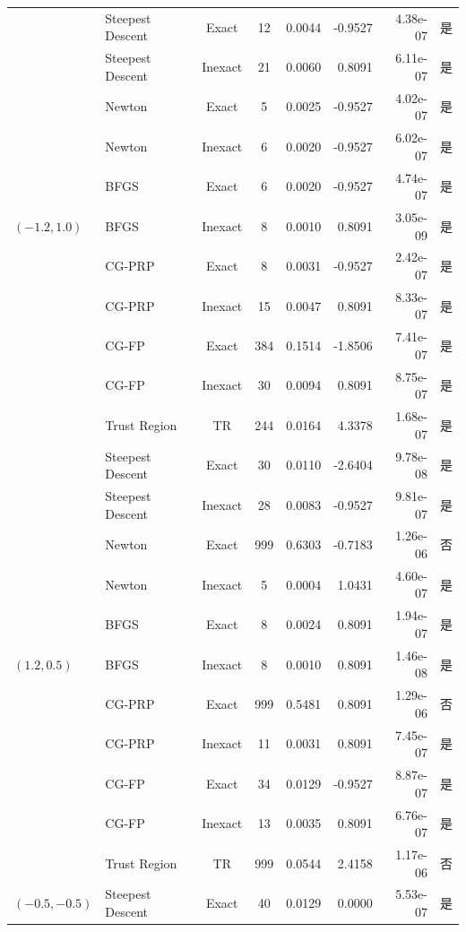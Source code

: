 \documentclass[a4paper,12pt]{article}
\begin{document}
{\begin{longtable}{llccrrrc}
    \multirow{11}{*}{$(-1.2, 1.0)$} 
    & Steepest Descent & Exact & 12 & 0.0044 & -0.9527 & 4.38e-07 & 是 \\
    & Steepest Descent & Inexact & 21 & 0.0060 & 0.8091 & 6.11e-07 & 是 \\
    & Newton & Exact & 5 & 0.0025 & -0.9527 & 4.02e-07 & 是 \\
    & Newton & Inexact & 6 & 0.0020 & -0.9527 & 6.02e-07 & 是 \\
    & BFGS & Exact & 6 & 0.0020 & -0.9527 & 4.74e-07 & 是 \\
    & BFGS & Inexact & 8 & 0.0010 & 0.8091 & 3.05e-09 & 是 \\
    & CG-PRP & Exact & 8 & 0.0031 & -0.9527 & 2.42e-07 & 是 \\
    & CG-PRP & Inexact & 15 & 0.0047 & 0.8091 & 8.33e-07 & 是 \\
    & CG-FP & Exact & 384 & 0.1514 & -1.8506 & 7.41e-07 & 是 \\
    & CG-FP & Inexact & 30 & 0.0094 & 0.8091 & 8.75e-07 & 是 \\
    & Trust Region & TR & 244 & 0.0164 & 4.3378 & 1.68e-07 & 是 \\
    \midrule
    \multirow{11}{*}{$(1.2, 0.5)$} 
    & Steepest Descent & Exact & 30 & 0.0110 & -2.6404 & 9.78e-08 & 是 \\
    & Steepest Descent & Inexact & 28 & 0.0083 & -0.9527 & 9.81e-07 & 是 \\
    & Newton & Exact & 999 & 0.6303 & -0.7183 & 1.26e-06 & 否 \\
    & Newton & Inexact & 5 & 0.0004 & 1.0431 & 4.60e-07 & 是 \\
    & BFGS & Exact & 8 & 0.0024 & 0.8091 & 1.94e-07 & 是 \\
    & BFGS & Inexact & 8 & 0.0010 & 0.8091 & 1.46e-08 & 是 \\
    & CG-PRP & Exact & 999 & 0.5481 & 0.8091 & 1.29e-06 & 否 \\
    & CG-PRP & Inexact & 11 & 0.0031 & 0.8091 & 7.45e-07 & 是 \\
    & CG-FP & Exact & 34 & 0.0129 & -0.9527 & 8.87e-07 & 是 \\
    & CG-FP & Inexact & 13 & 0.0035 & 0.8091 & 6.76e-07 & 是 \\
    & Trust Region & TR & 999 & 0.0544 & 2.4158 & 1.17e-06 & 否 \\
    \midrule
    \multirow{11}{*}{$(-0.5, -0.5)$} 
    & Steepest Descent & Exact & 40 & 0.0129 & 0.0000 & 5.53e-07 & 是 \\

\end{longtable}}
\end{document}
